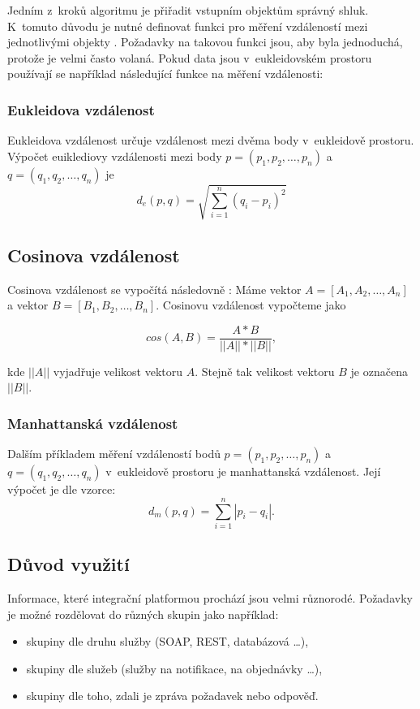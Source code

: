 \documentclass[thesis=M,czech]{FITthesis}[2012/10/20]
\begin{document}
			Jedním z~kroků algoritmu je přiřadit vstupním objektům správný shluk. K~tomuto důvodu je nutné definovat funkci pro měření vzdáleností mezi jednotlivými objekty \cite{IntroductionToDataMining}. Požadavky na takovou funkci jsou, aby byla jednoduchá, protože je velmi často volaná. Pokud data jsou v~eukleidovském prostoru používají se například následující funkce na měření vzdálenosti:
			
				\subsubsection{Eukleidova vzdálenost}
				\label{sec:eukleid_distance}
				Eukleidova vzdálenost určuje vzdálenost mezi dvěma body v~eukleidově prostoru. Výpočet euiklediovy vzdálenosti mezi body $p = (p_1, p_2, \ldots, p_n)$ a $q = (q_1, q_2, \ldots, q_n)$ je
				$$d_e(p,q) = \sqrt{\sum_{i = 1}^{n}(q_i - p_i)^2}$$
				
				\subsection{Cosinova vzdálenost}
				\label{sec:cosine_distance}
				Cosinova vzdálenost se vypočítá následovně \cite{cosine-similarity}: Máme vektor $A = [A_1,A_2,\ldots,A_n]$ a vektor $B = [B_1,B_2,\ldots,B_n]$. Cosinovu vzdálenost vypočteme jako
				
				$$cos(A,B) = \frac{A*B}{||A|| * ||B||},$$
				
				kde $||A||$ vyjadřuje velikost vektoru $A$. Stejně tak velikost vektoru $B$ je označena $||B||$.
				
		
				
				\subsubsection{Manhattanská vzdálenost}
				Dalším příkladem měření vzdáleností bodů $p = (p_1, p_2, \ldots, p_n)$ a $q = (q_1, q_2, \ldots, q_n)$ v~eukleidově prostoru je manhattanská vzdálenost. Její výpočet je dle vzorce:
				$$d_m(p,q) = \sum_{i = 1}^{n} |p_i - q_i|.$$
				
		\subsection{Důvod využití}
			Informace, které integrační platformou prochází jsou velmi různorodé. Požadavky je možné rozdělovat do různých skupin jako například:
			
			\begin{itemize} 
				\item skupiny dle druhu služby (SOAP, REST, databázová \ldots),
				\item skupiny dle služeb (služby na notifikace, na objednávky \ldots),
				\item skupiny dle toho, zdali je zpráva požadavek nebo odpověď.		
			\end{itemize}
		
\end{document}
